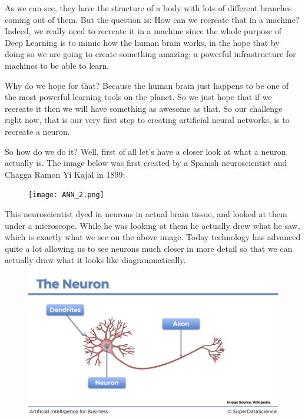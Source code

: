 \documentclass[]{book}
\begin{document}
As we can see, they have the structure of a body with lots of different branches coming out of them. But the question is: How can we recreate that in a machine? Indeed, we really need to recreate it in a machine since the whole purpose of Deep Learning is to mimic how the human brain works, in the hope that by doing so we are going to create something amazing: a powerful infrastructure for machines to be able to learn.

Why do we hope for that? Because the human brain just happens to be one of the most powerful learning tools on the planet. So we just hope that if we recreate it then we will have something as awesome as that. So our challenge right now, that is our very first step to creating artificial neural networks, is to recreate a neuron.

So how do we do it? Well, first of all let's have a closer look at what a neuron actually is. The image below was first created by a Spanish neuroscientist and Chagga Ramon Yi Kajal in 1899:

\begin{figure}[!htbp]
        \begin{center}
            \texttt{[image: ANN\_2.png]}
        \end{center}
\end{figure}

This neuroscientist dyed in neurons in actual brain tissue, and looked at them under a microscope. While he was looking at them he actually drew what he saw, which is exactly what we see on the above image. Today technology has advanced quite a lot allowing us to see neurons much closer in more detail so that we can actually draw what it looks like diagrammatically.

\begin{figure}[!htbp]
        \begin{center}
            \includegraphics[scale=0.16]{ANN_3.png}
        \end{center}
\end{figure}
\end{document}
